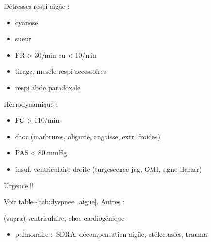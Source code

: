 \documentclass[11pt]{article}
\begin{document}
Détresses respi aigüe :

\begin{itemize}
\item cyanose
\item sueur
\item FR > 30/min ou < 10/min
\item tirage, muscle respi accessoires
\item respi abdo paradoxale
\end{itemize}

Hémodynamique :

\begin{itemize}
\item FC > 110/min
\item choc (marbrures, oligurie, angoisse, extr. froides)
\item PAS < 80 mmHg
\item insuf. ventriculaire droite (turgescence jug, OMI, signe Harzer)
\end{itemize}

Urgence !!

Voir table\textasciitilde{}\ref{tab:dyspnee_aigue}. Autres :

(supra)-ventriculaire, choc cardiogénique
\begin{itemize}
\item pulmonaire : SDRA, décompensation aigüe, atélectasies, trauma
\end{itemize}
\end{document}

